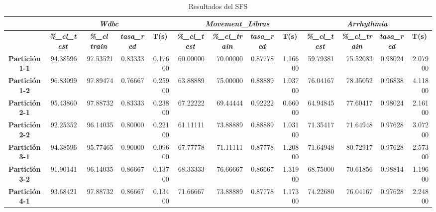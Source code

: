 \documentclass[a4paper,11pt]{article}
\begin{document}
   \begin{table}[H]	
    \caption*{Resultados del SFS}
    \begin{adjustbox}{width=1.1\textwidth}
    \begin{tabular}{|c|r|r|r|r|r|r|r|r|r|r|r|r|}
    \hline
    \multicolumn{1}{|l|}{} & \multicolumn{ 4}{c|}{\textbf{\textit{Wdbc}}} & \multicolumn{ 4}{c|}{\textbf{\textit{Movement\_Libras}}} & \multicolumn{ 4}{c|}{\textbf{\textit{Arrhythmia}}} \\ \hline
    \multicolumn{1}{|l|}{} & \multicolumn{1}{c|}{\textbf{\textit{\%\_cl\_test}}} & \multicolumn{1}{c|}{\textbf{\textit{\%\_cl train}}} & \multicolumn{1}{c|}{\textbf{\textit{tasa\_red}}} & \multicolumn{1}{c|}{\textbf{T(s)}} & \multicolumn{1}{c|}{\textbf{\textit{\%\_cl\_test}}} & \multicolumn{1}{c|}{\textbf{\textit{\%\_cl\_train}}} & \multicolumn{1}{c|}{\textbf{\textit{tasa\_red}}} & \multicolumn{1}{c|}{\textbf{T(s)}} & \multicolumn{1}{c|}{\textbf{\textit{\%\_cl\_test}}} & \multicolumn{1}{c|}{\textbf{\textit{\%\_cl\_train}}} & \multicolumn{1}{c|}{\textbf{\textit{tasa\_red}}} & \multicolumn{1}{c|}{\textbf{T(s)}} \\ \hline
    \textbf{Partición 1-1} & 94.38596 & 97.53521 & 0.83333 & 0.17600 & 60.00000 & 70.00000 & 0.87778 & 1.16600 & 59.79381 & 75.52083 & 0.98024 & 2.07900 \\ \hline
    \textbf{Partición 1-2} & 96.83099 & 97.89474 & 0.76667 & 0.25900 & 63.88889 & 75.00000 & 0.88889 & 1.03700 & 76.04167 & 78.35052 & 0.96838 & 4.11800 \\ \hline
    \textbf{Partición 2-1} & 95.43860 & 97.88732 & 0.83333 & 0.23800 & 67.22222 & 69.44444 & 0.92222 & 0.66000 & 64.94845 & 77.60417 & 0.98024 & 2.16100 \\ \hline
    \textbf{Partición 2-2} & 92.25352 & 96.14035 & 0.80000 & 0.22100 & 61.11111 & 73.88889 & 0.88889 & 1.03100 & 71.35417 & 71.64948 & 0.97628 & 3.07200 \\ \hline
    \textbf{Partición 3-1} & 94.38596 & 95.77465 & 0.90000 & 0.09600 & 67.77778 & 71.11111 & 0.87778 & 1.20800 & 71.64948 & 80.72917 & 0.97628 & 2.57300 \\ \hline
    \textbf{Partición 3-2} & 91.90141 & 96.14035 & 0.86667 & 0.13700 & 68.33333 & 76.66667 & 0.86667 & 1.31900 & 68.75000 & 70.61856 & 0.98814 & 1.19600 \\ \hline
    \textbf{Partición 4-1} & 93.68421 & 97.88732 & 0.86667 & 0.13400 & 71.66667 & 73.88889 & 0.87778 & 1.17300 & 74.22680 & 76.04167 & 0.97628 & 2.24800 \\ \hline

\end{tabular}
\end{adjustbox}
\end{table}
\end{document}
